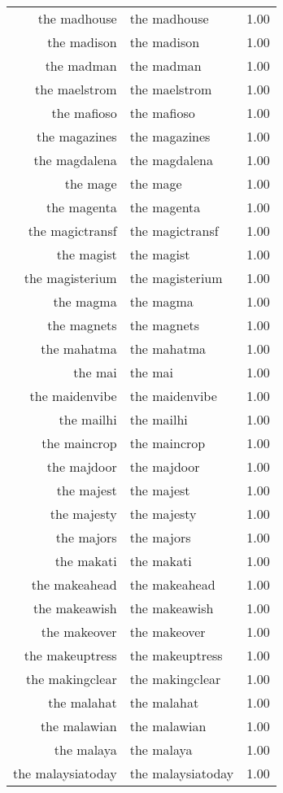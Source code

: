 \begin{table}[ht]
\begin{tabular}{rlr}
  the madhouse & the madhouse & 1.00 \\ 
  the madison & the madison & 1.00 \\ 
  the madman & the madman & 1.00 \\ 
  the maelstrom & the maelstrom & 1.00 \\ 
  the mafioso & the mafioso & 1.00 \\ 
  the magazines & the magazines & 1.00 \\ 
  the magdalena & the magdalena & 1.00 \\ 
  the mage & the mage & 1.00 \\ 
  the magenta & the magenta & 1.00 \\ 
  the magictransf & the magictransf & 1.00 \\ 
  the magist & the magist & 1.00 \\ 
  the magisterium & the magisterium & 1.00 \\ 
  the magma & the magma & 1.00 \\ 
  the magnets & the magnets & 1.00 \\ 
  the mahatma & the mahatma & 1.00 \\ 
  the mai & the mai & 1.00 \\ 
  the maidenvibe & the maidenvibe & 1.00 \\ 
  the mailhi & the mailhi & 1.00 \\ 
  the maincrop & the maincrop & 1.00 \\ 
  the majdoor & the majdoor & 1.00 \\ 
  the majest & the majest & 1.00 \\ 
  the majesty & the majesty & 1.00 \\ 
  the majors & the majors & 1.00 \\ 
  the makati & the makati & 1.00 \\ 
  the makeahead & the makeahead & 1.00 \\ 
  the makeawish & the makeawish & 1.00 \\ 
  the makeover & the makeover & 1.00 \\ 
  the makeuptress & the makeuptress & 1.00 \\ 
  the makingclear & the makingclear & 1.00 \\ 
  the malahat & the malahat & 1.00 \\ 
  the malawian & the malawian & 1.00 \\ 
  the malaya & the malaya & 1.00 \\ 
  the malaysiatoday & the malaysiatoday & 1.00 \\ 

\end{tabular}
\end{table}
